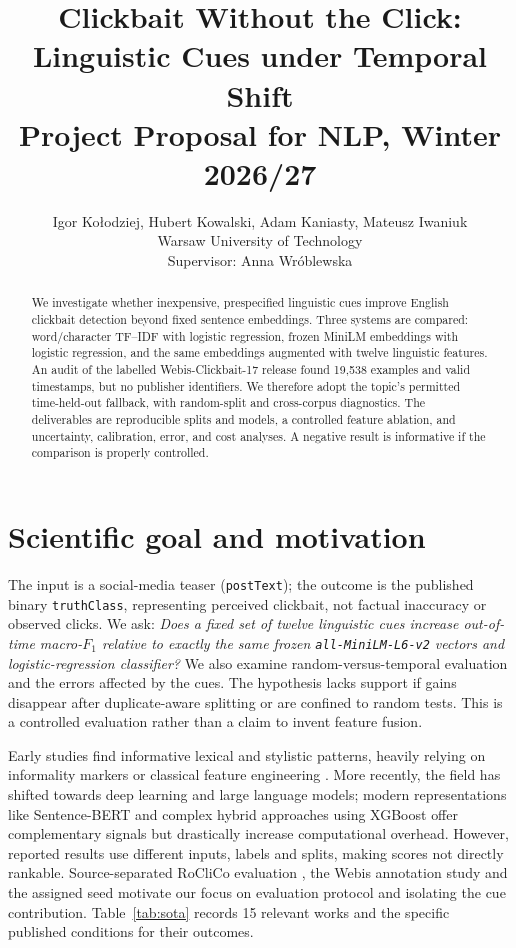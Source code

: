 \documentclass[11pt]{article}
\title{Clickbait Without the Click:\\Linguistic Cues under Temporal Shift\\Project Proposal for NLP, Winter 2026/27}
\author{Igor Ko{\l}odziej, Hubert Kowalski, Adam Kaniasty, Mateusz Iwaniuk \\
Warsaw University of Technology\\
Supervisor: Anna Wr{\'o}blewska}
\date{}
\newcommand{\mF}{macro-\(F_1\)}
\begin{document}
\maketitle
\begin{abstract}
We investigate whether inexpensive, prespecified linguistic cues improve English clickbait detection beyond fixed sentence embeddings. Three systems are compared: word/character TF--IDF with logistic regression, frozen MiniLM embeddings with logistic regression, and the same embeddings augmented with twelve linguistic features. An audit of the labelled Webis-Clickbait-17 release found 19,538 examples and valid timestamps, but no publisher identifiers. We therefore adopt the topic's permitted time-held-out fallback, with random-split and cross-corpus diagnostics. The deliverables are reproducible splits and models, a controlled feature ablation, and uncertainty, calibration, error, and cost analyses. A negative result is informative if the comparison is properly controlled.
\end{abstract}

\section{Scientific goal and motivation}
The input is a social-media teaser (\texttt{postText}); the outcome is the published binary \texttt{truthClass}, representing perceived clickbait, not factual inaccuracy or observed clicks. We ask: \emph{Does a fixed set of twelve linguistic cues increase out-of-time \mF{} relative to exactly the same frozen \texttt{all-MiniLM-L6-v2} vectors and logistic-regression classifier?} We also examine random-versus-temporal evaluation and the errors affected by the cues. The hypothesis lacks support if gains disappear after duplicate-aware splitting or are confined to random tests. This is a controlled evaluation rather than a claim to invent feature fusion.


Early studies find informative lexical and stylistic patterns, heavily relying on informality markers or classical feature engineering \cite{potthast2016,biyani2016}. More recently, the field has shifted towards deep learning and large language models; modern representations like Sentence-BERT \cite{reimers2019sbert} and complex hybrid approaches using XGBoost \cite{michaluk2026} offer complementary signals but drastically increase computational overhead. However, reported results use different inputs, labels and splits, making scores not directly rankable. Source-separated RoCliCo evaluation \cite{roclico2023}, the Webis annotation study \cite{potthast2018} and the assigned seed \cite{michaluk2026} motivate our focus on evaluation protocol and isolating the cue contribution. Table~\ref{tab:sota} records 15 relevant works and the specific published conditions for their outcomes.
\end{document}
